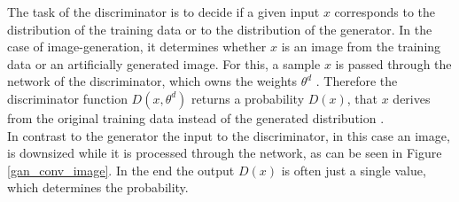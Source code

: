 The task of the discriminator is to decide if a given input $x$ corresponds to the distribution of the training data or to the distribution of the generator.
In the case of image-generation, it determines whether $x$ is an image from the training data or an artificially generated image.
For this, a sample $x$ is passed through the network of the discriminator, which owns the weights $\theta^d$ \cite{Goodfellow2020}.
Therefore the discriminator function $D(x, \theta^d)$ returns a probability $D(x)$, that $x$ derives from the original training data instead of the generated distribution \cite{Goodfellow2014}.\\
In contrast to the generator the input to the discriminator, in this case an image, is downsized while it is processed through the network, as can be seen in Figure \ref{gan_conv_image}.
In the end the output $D(x)$ is often just a single value, which determines the probability.

